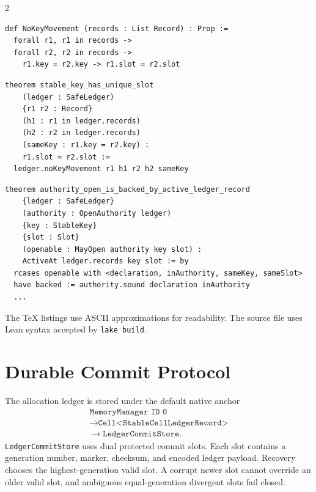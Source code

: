 \documentclass[11pt]{article}
\begin{document}
\begin{multicols}{2}
\begin{lstlisting}[language=Lean,caption={Core allocation records and ledger invariants.}]
def NoKeyMovement (records : List Record) : Prop :=
  forall r1, r1 in records ->
  forall r2, r2 in records ->
    r1.key = r2.key -> r1.slot = r2.slot
\end{lstlisting}

\begin{lstlisting}[language=Lean,caption={The checked no-movement theorem.}]
theorem stable_key_has_unique_slot
    (ledger : SafeLedger)
    {r1 r2 : Record}
    (h1 : r1 in ledger.records)
    (h2 : r2 in ledger.records)
    (sameKey : r1.key = r2.key) :
    r1.slot = r2.slot :=
  ledger.noKeyMovement r1 h1 r2 h2 sameKey
\end{lstlisting}

\begin{lstlisting}[language=Lean,caption={Post-commit opening is backed by the ledger.}]
theorem authority_open_is_backed_by_active_ledger_record
    {ledger : SafeLedger}
    (authority : OpenAuthority ledger)
    {key : StableKey}
    {slot : Slot}
    (openable : MayOpen authority key slot) :
    ActiveAt ledger.records key slot := by
  rcases openable with <declaration, inAuthority, sameKey, sameSlot>
  have backed := authority.sound declaration inAuthority
  ...
\end{lstlisting}

The TeX listings use ASCII approximations for readability. The source file uses
Lean syntax accepted by \texttt{lake build}.

\section{Durable Commit Protocol}

The allocation ledger is stored under the default native anchor
\[
  \begin{gathered}
  \texttt{MemoryManager ID 0}\\
  \rightarrow \texttt{Cell<StableCellLedgerRecord>}\\
  \rightarrow \texttt{LedgerCommitStore}.
  \end{gathered}
\]
\texttt{LedgerCommitStore} uses dual protected commit slots. Each slot contains
a generation number, marker, checksum, and encoded ledger payload. Recovery
chooses the highest-generation valid slot. A corrupt newer slot cannot override
an older valid slot, and ambiguous equal-generation divergent slots fail closed.


\end{multicols}
\end{document}
